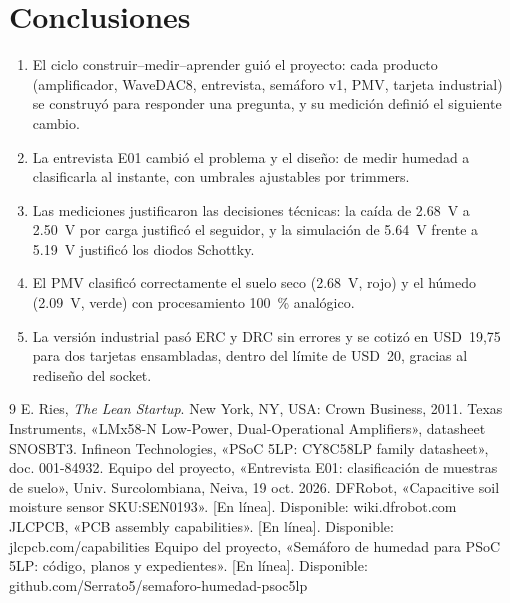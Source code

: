 \documentclass[11pt,a4paper]{article}
\begin{document}
\section{Conclusiones}
\begin{enumerate}
\item El ciclo construir--medir--aprender guió el proyecto: cada producto (amplificador, WaveDAC8, entrevista, semáforo v1, PMV, tarjeta industrial) se construyó para responder una pregunta, y su medición definió el siguiente cambio.
\item La entrevista E01 cambió el problema y el diseño: de medir humedad a clasificarla al instante, con umbrales ajustables por trimmers.
\item Las mediciones justificaron las decisiones técnicas: la caída de \SI{2.68}{V} a \SI{2.50}{V} por carga justificó el seguidor, y la simulación de \SI{5.64}{V} frente a \SI{5.19}{V} justificó los diodos Schottky.
\item El PMV clasificó correctamente el suelo seco (\SI{2.68}{V}, rojo) y el húmedo (\SI{2.09}{V}, verde) con procesamiento 100~\% analógico.
\item La versión industrial pasó ERC y DRC sin errores y se cotizó en USD~19,75 para dos tarjetas ensambladas, dentro del límite de USD~20, gracias al rediseño del socket.
\end{enumerate}

\begin{thebibliography}{9}
 E. Ries, \emph{The Lean Startup}. New York, NY, USA: Crown Business, 2011.
 Texas Instruments, «LMx58-N Low-Power, Dual-Operational Amplifiers», datasheet SNOSBT3.
 Infineon Technologies, «PSoC 5LP: CY8C58LP family datasheet», doc. 001-84932.
 Equipo del proyecto, «Entrevista E01: clasificación de muestras de suelo», Univ. Surcolombiana, Neiva, 19 oct. 2026.
 DFRobot, «Capacitive soil moisture sensor SKU:SEN0193». [En línea]. Disponible: wiki.dfrobot.com
 JLCPCB, «PCB assembly capabilities». [En línea]. Disponible: jlcpcb.com/capabilities
 Equipo del proyecto, «Semáforo de humedad para PSoC 5LP: código, planos y expedientes». [En línea]. Disponible: github.com/Serrato5/semaforo-humedad-psoc5lp
\end{thebibliography}
\end{document}
